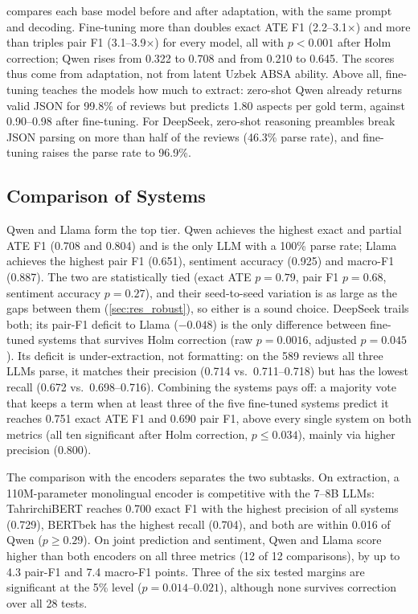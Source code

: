 \documentclass[runningheads]{llncs}
\begin{document}
 compares each base model before and after adaptation, with the same prompt and decoding. Fine-tuning more than doubles exact ATE F1 (2.2--3.1$\times$) and more than triples pair F1 (3.1--3.9$\times$) for every model, all with $p<0.001$ after Holm correction; Qwen rises from 0.322 to 0.708 and from 0.210 to 0.645. The scores thus come from adaptation, not from latent Uzbek ABSA ability. Above all, fine-tuning teaches the models how much to extract: zero-shot Qwen already returns valid JSON for 99.8\% of reviews but predicts 1.80 aspects per gold term, against 0.90--0.98 after fine-tuning. For DeepSeek, zero-shot reasoning preambles break JSON parsing on more than half of the reviews (46.3\% parse rate), and fine-tuning raises the parse rate to 96.9\%.

\subsection{Comparison of Systems}
\label{sec:res_compare}

Qwen and Llama form the top tier. Qwen achieves the highest exact and partial ATE F1 (0.708 and 0.804) and is the only LLM with a 100\% parse rate; Llama achieves the highest pair F1 (0.651), sentiment accuracy (0.925) and macro-F1 (0.887). The two are statistically tied (exact ATE $p{=}0.79$, pair F1 $p{=}0.68$, sentiment accuracy $p{=}0.27$), and their seed-to-seed variation is as large as the gaps between them (\cref{sec:res_robust}), so either is a sound choice. DeepSeek trails both; its pair-F1 deficit to Llama ($-0.048$) is the only difference between fine-tuned systems that survives Holm correction (raw $p{=}0.0016$, adjusted $p{=}0.045$). Its deficit is under-extraction, not formatting: on the 589 reviews all three LLMs parse, it matches their precision (0.714 vs.\ 0.711--0.718) but has the lowest recall (0.672 vs.\ 0.698--0.716). Combining the systems pays off: a majority vote that keeps a term when at least three of the five fine-tuned systems predict it reaches 0.751 exact ATE F1 and 0.690 pair F1, above every single system on both metrics (all ten significant after Holm correction, $p \le 0.034$), mainly via higher precision (0.800).

The comparison with the encoders separates the two subtasks. On extraction, a 110M-parameter monolingual encoder is competitive with the 7--8B LLMs: TahrirchiBERT reaches 0.700 exact F1 with the highest precision of all systems (0.729), BERTbek has the highest recall (0.704), and both are within 0.016 of Qwen ($p \ge 0.29$). On joint prediction and sentiment, Qwen and Llama score higher than both encoders on all three metrics (12 of 12 comparisons), by up to 4.3 pair-F1 and 7.4 macro-F1 points. Three of the six tested margins are significant at the 5\% level ($p{=}0.014$--$0.021$), although none survives correction over all 28 tests.
\end{document}
